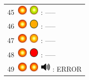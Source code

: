\documentclass[12pt, a4paper]{report}
\begin{document}
\begin{minipage}{0.45\textwidth}
\begin{Large}
\begin{tabular}{l}
		45\  \includegraphics*[width=5mm]{red_led_flashing} \includegraphics*[width=5mm]{green_led_flashing} : -----\\
	
		46\  \includegraphics*[width=5mm]{red_led_flashing} \includegraphics*[width=5mm]{orange_led} : -----\\
		
		47\  \includegraphics*[width=5mm]{red_led_flashing} \includegraphics*[width=5mm]{orange_led_flashing} : -----\\
		
		48\  \includegraphics*[width=5mm]{red_led_flashing} \includegraphics*[width=5mm]{red_led} : -----\\
		
		49\  \includegraphics*[width=5mm]{red_led_flashing} \includegraphics*[width=5mm]{red_led_flashing} \includegraphics*[width=5mm]{speaker} : ERROR\\
	\end{tabular}
	\end{Large}
	\end{minipage}%

\vspace{1cm}
\end{document}
